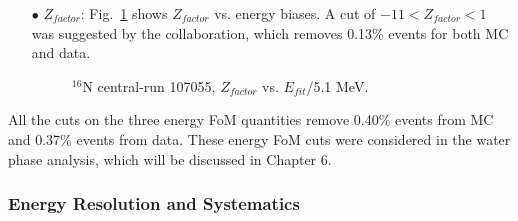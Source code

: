 \begin{itemize}
	\item[$\bullet$]$Z_{factor}$:
	Fig.~\ref{energyFOM_Zfactor} shows $Z_{factor}$ vs. energy biases. A cut of $-11<Z_{factor}<1$ was suggested by the collaboration, which removes 0.13\% events for both MC and data.		
	\begin{figure}[!htb]
		\centering
		\caption{$^{16}$N central-run 107055, $Z_{factor}$ vs. $E_{fit}$/5.1 MeV.\label{energyFOM_Zfactor}}
		
	\end{figure}
	
	
\end{itemize}

All the cuts on the three energy FoM quantities remove 0.40\% events from MC and 0.37\% events from data. These energy FoM cuts were considered in the water phase analysis, which will be discussed in Chapter 6.

\subsubsection{Energy Resolution and Systematics} \label{sect:energySystematics}

